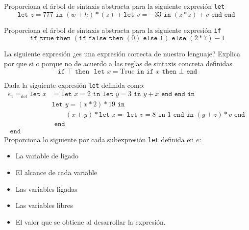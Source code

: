 \bigskip
    \begin{exercise}
        Proporciona el árbol de sintaxis abstracta para la siguiente expresión \texttt{let}
        \[ 
            \texttt{let } z = 777 \texttt{ in } (w + h) * (z) + \texttt{let } v = -33 \texttt{ in } (z * z) + v \texttt{ end } \texttt{end } 
        \]
    \end{exercise}

    \bigskip
    
    \begin{exercise}
        Proporciona el árbol de sintaxis abstracta para la siguiente expresión \texttt{if}
        \[
            \texttt{if } \texttt{true} \texttt{ then } (\texttt{if }  \texttt{false} \texttt{ then } (0) \texttt{ else 1}) \texttt{ else } (2 * 7) - 1
        \]
    \end{exercise}

    \bigskip
    
    \begin{exercise}
        La siguiente expresión ¿es una expresión correcta de nuestro lenguaje? Explica por que si o porque no de acuerdo a las reglas de sintaxis concreta definidas.
        \[
            \texttt{if } \top \texttt{ then } \texttt{ let } x = \text{True} \texttt{ in} \texttt{ if } x \texttt{ then } \bot \texttt{ end} 
        \]
    \end{exercise}

    \bigskip
    
    \begin{exercise}
        Dada la siguiente expresión \texttt{let} definida como:
        \begin{align*}
        	e_1=_{\text{def}}\texttt{let  }
        		x&= \texttt{let }x = 2 \texttt{ in } \texttt{let } y = 3 \texttt{ in } y + x \texttt{ end } \texttt{end}
        		\texttt{ in }\\
        		 &\texttt{let }y=(x \ast 2) \ast 19 
        		 	\texttt{ in } \\
        		 & \qquad(x + y) \ast \texttt{let } z = \texttt{ let } v = 8 \texttt{ in } 1 \texttt{ end} \texttt{ in } 
        		 						(y + z) \ast v 
        		 				\texttt{ end }\\
        		 &\texttt{ end }\\
        	\texttt{ end }&
        \end{align*}
        Proporciona lo siguiente por cada subexpresión \texttt{let} definida en $e$:
        \begin{itemize}
	 \item La variable de ligado
            \item El alcance de cada variable
            \item Las variables ligadas
	 \item Las variables libres
            \item El valor que se obtiene al desarrollar la expresión.
        \end{itemize}
    \end{exercise}

